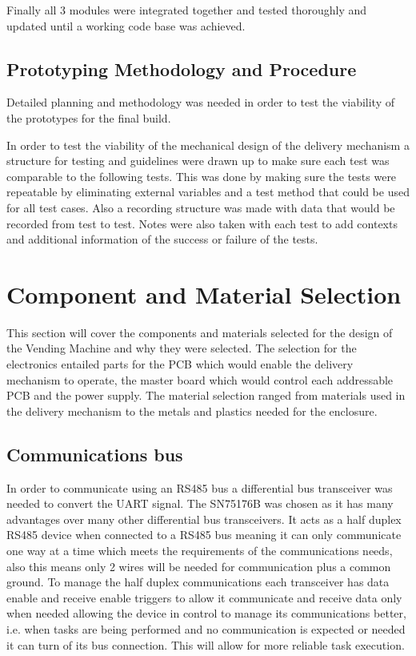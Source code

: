 \documentclass[a4paper,11pt]{article}
\numberwithin{figure}{section}
\numberwithin{table}{section}
\begin{document}
Finally all 3 modules were integrated together and tested thoroughly and updated until a working code base was achieved. 

\subsection{Prototyping Methodology and Procedure}
Detailed planning and methodology was needed in order to test the viability of the prototypes for the final build.

In order to test the viability of the mechanical design of the delivery mechanism a structure for testing and guidelines were drawn up to make sure each test was comparable to the following tests. This was done by making sure the tests were repeatable by eliminating external variables and a test method that could be used for all test cases. Also a recording structure was made with data that would be recorded from test to test. Notes were also taken with each test to add contexts and additional information of the success or failure of the tests.

\newpage
\section{Component and Material Selection}
This section will cover the components and materials selected for the design of the Vending Machine and why they were selected. The selection for the electronics entailed parts for the PCB which would enable the delivery mechanism to operate, the master board which would control each addressable PCB and the power supply. The material selection ranged from materials used in the delivery mechanism to the metals and plastics needed for the enclosure.

\subsection{Communications bus}
\label{subsec:bus}
In order to communicate using an RS485 bus a differential bus transceiver was needed to convert the UART signal. The SN75176B was chosen as it has many advantages over many other differential bus transceivers. It acts as a half duplex RS485 device when connected to a RS485 bus meaning it can only communicate one way at a time which meets the requirements of the communications needs, also this means only 2 wires will be needed for communication plus a common ground. To manage the half duplex communications each transceiver has data enable and receive enable triggers to allow it communicate and receive data only when needed allowing the device in control to manage its communications better, i.e. when tasks are being performed and no communication is expected or needed it can turn of its  bus connection. This will allow for more reliable task execution.
\end{document}
